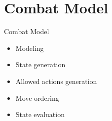 \documentclass{beamer}
\newenvironment{framesec}{
    \begin{frame}{\secname}
}{\end{frame}}
\begin{document}
\section{Combat Model}
\begin{framesec}
    \begin{block}{Combat Model} 
        \begin{itemize}
            \item Modeling
            \item State generation
            \item Allowed actions generation
            \item Move ordering
            \item State evaluation
        \end{itemize}
    \end{block}
\end{framesec}
\end{document}

